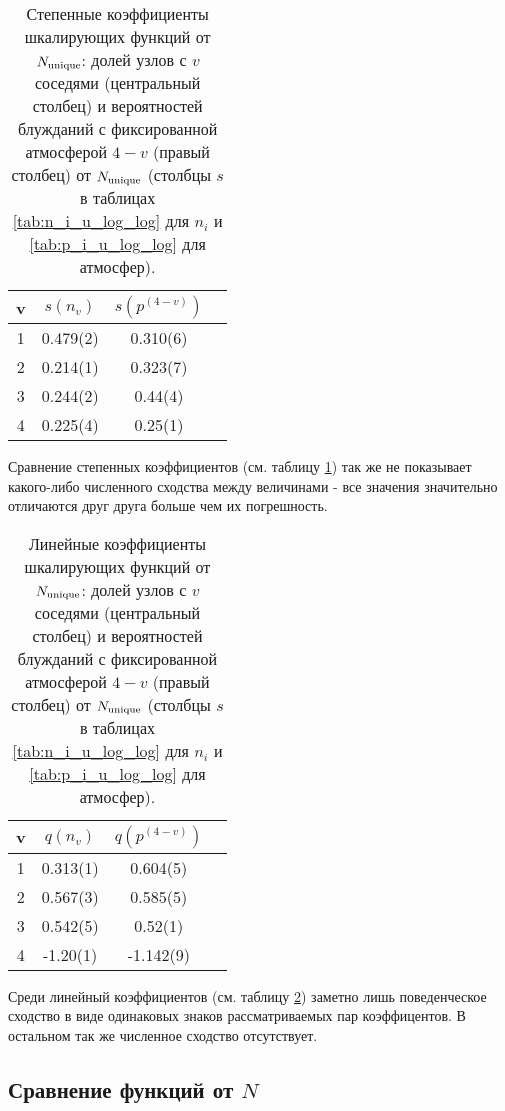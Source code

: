 \begin{table}[h]
\centering
\begin{tabular}{|c|c|c|c|}
\hline
v & $s(n_v)$ & $s(p^{(4-v)})$ \\ \hline
1 & 0.479(2) & 0.310(6) \\ \hline
2 & 0.214(1) & 0.323(7) \\ \hline
3 & 0.244(2) & 0.44(4) \\ \hline
4 & 0.225(4) & 0.25(1) \\ \hline
\end{tabular}
\caption{Степенные коэффициенты шкалирующих функций от $N_{\textup{unique}}$: долей узлов с $v$ соседями (центральный столбец) и вероятностей блужданий с фиксированной атмосферой $4-v$ (правый столбец) от $N_{\textup{unique}}$ (столбцы $s$ в таблицах \ref{tab:n_i_u_log_log} для $n_i$ и \ref{tab:p_i_u_log_log} для атмосфер).}
\label{tab:n_vs_atm_s}
\end{table}

Сравнение степенных коэффициентов (см. таблицу \ref{tab:n_vs_atm_s}) так же не показывает какого-либо численного сходства  между величинами - все значения значительно отличаются друг друга больше чем их погрешность.

\begin{table}[h]
\centering
\begin{tabular}{|c|c|c|c|}
\hline
v & $q(n_v)$ & $q(p^{(4-v)})$ \\ \hline
1 & 0.313(1) & 0.604(5) \\ \hline
2 & 0.567(3) & 0.585(5) \\ \hline
3 & 0.542(5) & 0.52(1) \\ \hline
4 & -1.20(1) & -1.142(9) \\ \hline
\end{tabular}
\caption{Линейные коэффициенты шкалирующих функций от $N_{\textup{unique}}$: долей узлов с $v$ соседями (центральный столбец) и вероятностей блужданий с фиксированной атмосферой $4-v$ (правый столбец) от $N_{\textup{unique}}$ (столбцы $s$ в таблицах \ref{tab:n_i_u_log_log} для $n_i$ и \ref{tab:p_i_u_log_log} для атмосфер).}
\label{tab:n_vs_atm_q}
\end{table}

Среди линейный коэффициентов (см. таблицу \ref{tab:n_vs_atm_q}) заметно лишь поведенческое сходство в виде одинаковых знаков рассматриваемых пар коэффицентов. В остальном так же численное сходство отсутствует.

\subsection{Сравнение функций от $N$}

